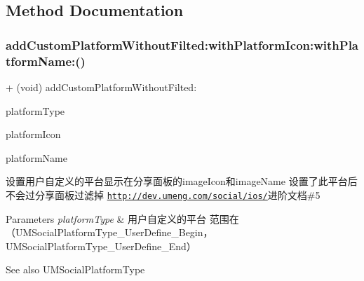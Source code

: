 \subsection{Method Documentation}
\mbox{\label{interface_u_m_social_u_i_manager_a476b572ec6e1b4a7a33c4cd66df8f343}} 
\subsubsection{\texorpdfstring{add\+Custom\+Platform\+Without\+Filted\+:with\+Platform\+Icon\+:with\+Platform\+Name\+:()}{addCustomPlatformWithoutFilted:withPlatformIcon:withPlatformName:()}\hspace{0.1cm}{\footnotesize\ttfamily [1/2]}}
{\footnotesize\ttfamily + (void) add\+Custom\+Platform\+Without\+Filted\+: \begin{DoxyParamCaption}\item[{(U\+M\+Social\+Platform\+Type)}]{platform\+Type }\item[{withPlatformIcon:(U\+I\+Image $\ast$)}]{platform\+Icon }\item[{withPlatformName:(N\+S\+String $\ast$)}]{platform\+Name }\end{DoxyParamCaption}}

设置用户自定义的平台显示在分享面板的image\+Icon和image\+Name 设置了此平台后不会过分享面板过滤掉 \href{http://dev.umeng.com/social/ios/}{\tt http\+://dev.\+umeng.\+com/social/ios/}进阶文档\#5


\begin{DoxyParams}{Parameters}
{\em platform\+Type} & 用户自定义的平台 范围在（\+U\+M\+Social\+Platform\+Type\+\_\+\+User\+Define\+\_\+\+Begin，\+U\+M\+Social\+Platform\+Type\+\_\+\+User\+Define\+\_\+\+End） \\
\hline
\end{DoxyParams}
\begin{DoxySeeAlso}{See also}
U\+M\+Social\+Platform\+Type 
\end{DoxySeeAlso}

